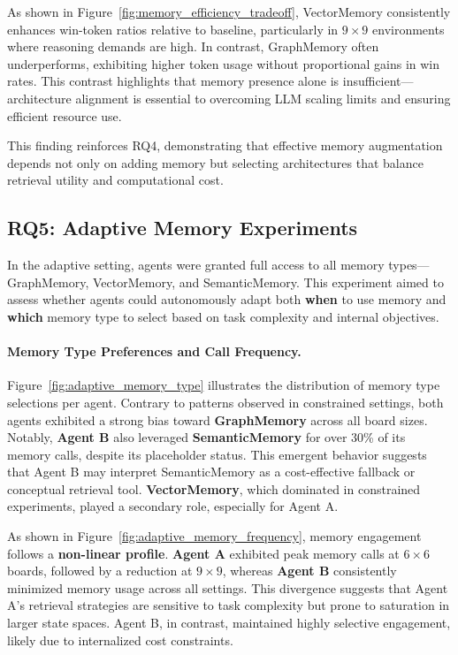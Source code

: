 \documentclass[10pt]{article}
\begin{document}
As shown in Figure~\ref{fig:memory_efficiency_tradeoff}, VectorMemory consistently enhances win-token ratios relative to baseline, particularly in $9\times9$ environments where reasoning demands are high. In contrast, GraphMemory often underperforms, exhibiting higher token usage without proportional gains in win rates. This contrast highlights that memory presence alone is insufficient—architecture alignment is essential to overcoming LLM scaling limits and ensuring efficient resource use.

This finding reinforces RQ4, demonstrating that effective memory augmentation depends not only on adding memory but selecting architectures that balance retrieval utility and computational cost.

\subsection{RQ5: Adaptive Memory Experiments}

In the adaptive setting, agents were granted full access to all memory types—GraphMemory, VectorMemory, and SemanticMemory. This experiment aimed to assess whether agents could autonomously adapt both \textbf{when} to use memory and \textbf{which} memory type to select based on task complexity and internal objectives.

\paragraph{Memory Type Preferences and Call Frequency.}
Figure~\ref{fig:adaptive_memory_type} illustrates the distribution of memory type selections per agent. Contrary to patterns observed in constrained settings, both agents exhibited a strong bias toward \textbf{GraphMemory} across all board sizes. Notably, \textbf{Agent B} also leveraged \textbf{SemanticMemory} for over 30\% of its memory calls, despite its placeholder status. This emergent behavior suggests that Agent B may interpret SemanticMemory as a cost-effective fallback or conceptual retrieval tool. \textbf{VectorMemory}, which dominated in constrained experiments, played a secondary role, especially for Agent A.

As shown in Figure~\ref{fig:adaptive_memory_frequency}, memory engagement follows a \textbf{non-linear profile}. \textbf{Agent A} exhibited peak memory calls at $6\times6$ boards, followed by a reduction at $9\times9$, whereas \textbf{Agent B} consistently minimized memory usage across all settings. This divergence suggests that Agent A's retrieval strategies are sensitive to task complexity but prone to saturation in larger state spaces. Agent B, in contrast, maintained highly selective engagement, likely due to internalized cost constraints.
\end{document}
